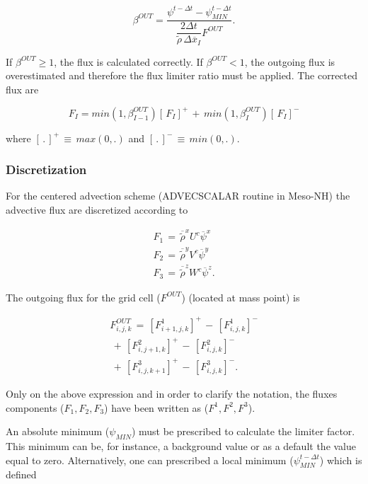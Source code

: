 \begin{equation}
\beta^{OUT}=
 \dfrac{ \psi^{t-\Delta t}- \psi_{MIN}^{t-\Delta t} }
{ \dfrac{2 \Delta t}{\tilde{\rho}\,\Delta \overline{x}_{I}} {F}^{OUT}}.
\end{equation}

If $\beta^{OUT} \geq 1$, the flux is calculated correctly.
If $\beta^{OUT}<1$, the outgoing flux is overestimated and therefore the flux limiter
ratio must be applied.
The corrected flux are

\begin{equation}
\label{cond5}
{F}_{I} = min(1,\beta^{OUT}_{I-1})[\,F_{I}]^{+}\,+\,
min(1,\beta^{OUT}_{I})[\,F_{I}]^{-}
\end{equation}

\noindent where $[\,.\,]^{+}\,\equiv\, max(0,.)$ and $[\,.\,]^{-}\,\equiv\,min(0,.)$.

\subsubsection{Discretization}

For the centered advection scheme (ADVECSCALAR routine in Meso-NH) the advective
flux are discretized according to

\begin{eqnarray}
F_1\,=\,
\overline{\tilde{\rho}}^{x}U^{c} \overline{\psi}^{x} \\
F_2\,=\,
\overline{\tilde{\rho}}^{y}V^{c} \overline{\psi}^{y} \\
F_3\,=\,
\overline{\tilde{\rho}}^{z}W^{c} \overline{\psi}^{z}.
\end{eqnarray}

The outgoing flux for the grid cell ($F^{OUT}$) (located at mass point) is

\begin{eqnarray}
F^{OUT}_{i,j,k}\,=\,[F^1_{i+1,j,k}]^+\,-\,[F^1_{i,j,k}]^-
\nonumber \\
\,+\,[F^2_{i,j+1,k}]^+\,-\,[F^2_{i,j,k}]^-
\nonumber \\
\,+\,[F^3_{i,j,k+1}]^+\,-\,[F^3_{i,j,k}]^-.
\end{eqnarray}

Only on the above expression and in order to clarify the notation, the fluxes
components ($F_1,F_2,F_3$) have been written as ($F^1,F^2,F^3$).

An absolute minimum ($\psi_{MIN}$) must be prescribed to calculate the limiter factor.
This minimum can be, for instance, a
background value or as a default the value equal to zero.
Alternatively, one can prescribed a local minimum ($\psi_{MIN}^{t-\Delta {t}}$)
which is defined

